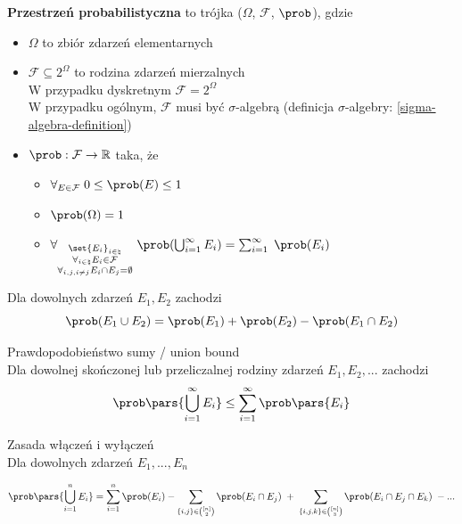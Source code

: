 \begin{definition}
	\textbf{Przestrzeń probabilistyczna} to trójka (\(\Omega\), \(\mathcal{F}\), \(\prob\)), gdzie
	\begin{itemize}
		\item \(\Omega\) to zbiór zdarzeń elementarnych
		\item \(\mathcal{F} \subseteq 2^{\Omega}\) to rodzina zdarzeń mierzalnych\\
		      W przypadku dyskretnym \(\mathcal{F} = 2^{\Omega}\)\\
		      W przypadku ogólnym, \(\mathcal{F}\) musi być \(\sigma\)-algebrą (definicja \(\sigma\)-algebry: \ref{sigma-algebra-definition})
		\item \(\prob : \mathcal{F} \to \mathbb{R}\) taka, że
		      \begin{itemize}
			      \item \(\forall_{E \in \mathcal{F}} \; 0 \leq \prob(E) \leq 1\)
			      \item \(\prob(\Omega) = 1\)
			      \item \(\forall_{\substack{\set{E_i}_{i \in \natural} \\ \forall_{i \in \natural} E_i \in \mathcal{F} \\ \forall_{i, j, i \not= j} E_i \cap E_j = \emptyset}} \; \prob(\bigcup_{i=1}^\infty E_i) = \sum_{i=1}^\infty \; \prob(E_i)\)
		      \end{itemize}
	\end{itemize}
\end{definition}

\begin{lemma}
	Dla dowolnych zdarzeń \(E_1, E_2\) zachodzi
	\[
		\prob(E_1 \cup E_2) = \prob(E_1) + \prob(E_2) - \prob(E_1 \cap E_2)
	\]
\end{lemma}

\begin{lemma} Prawdopodobieństwo sumy / union bound\\
	\label{union-bound}
	Dla dowolnej skończonej lub przeliczalnej rodziny zdarzeń \(E_1, E_2, ...\) zachodzi
	\[
		\prob\pars{\bigcup_{i=1}^\infty E_i} \leq \sum_{i=1}^\infty \prob\pars{E_i}
	\]
\end{lemma}

\begin{lemma} Zasada włączeń i wyłączeń \\
	Dla dowolnych zdarzeń \(E_1, ..., E_n\)

	\[
		\prob\pars{\bigcup_{i=1}^n E_i} = \sum_{i=1}^n \prob(E_i) - \sum_{\{i,j\} \in \binom{[n]}{2}} \prob(E_i \cap E_j) \; + \; \sum_{\{i,j,k\} \in \binom{[n]}{3}} \prob(E_i \cap E_j \cap E_k) \; - ...
	\]
\end{lemma}


